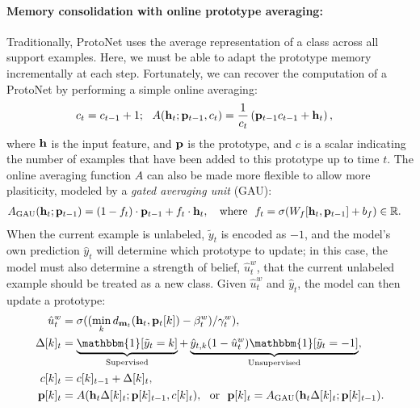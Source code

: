 \paragraph{Memory consolidation with online prototype averaging:}
Traditionally, ProtoNet uses the average representation of a class across all support examples.
Here, we must be able to adapt the prototype memory incrementally at each step. 
Fortunately, we can recover the computation of a ProtoNet by performing a simple online averaging:
\vskip -0.8cm
\begin{align}
c_t &= c_{t-1} + 1; \ \ A(\mathbf{h}_t; \mathbf{p}_{t-1}, c_t) = \frac{1}{c_t} \left( \mathbf{p}_{t-1} c_{t-1} +\mathbf{h}_t \right),
\end{align}
\vskip -0.3cm
where $\mathbf{h}$ is the input feature, and $\mathbf{p}$ is the prototype, and $c$ is a scalar indicating the
number of examples that have been added to this prototype up to time $t$. The online averaging function
$A$ can also be made more flexible to allow more plasiticity, modeled by a
\textit{gated averaging unit} (GAU):
\vskip -0.5cm
\begin{align}
A_{\text{GAU}}(\mathbf{h}_t; \mathbf{p}_{t-1}) &= (1-f_t) \cdot \mathbf{p}_{t-1} + f_t \cdot \mathbf{h}_t, \ \ \ \text{where} \
\ f_t = \sigma(W_f [\mathbf{h}_t, \mathbf{p}_{t-1}] + b_f) \in \mathbb{R}.
\end{align}
\vskip -0.25cm
When the current example is
unlabeled, $\tilde{y}_t$ is encoded as $-1$, and the model's own prediction $\hat{y}_t$ will determine
which prototype to update; in this case, the model must also determine a strength of belief,
$\hat{u}_t^w$, that the current unlabeled example should be treated as a new class.  Given
$\hat{u}_t^w$ and $\hat{y}_t$, the model can then update a prototype:
\vskip -0.5cm
\begin{align}
\hat{u}_t^{w} &= \sigmoid((\min_k d_{\bmm_t}(\bh_t, \bp_t[k]) - \beta_t^w) / \gamma_t^w),\\
\Delta[k]_t   &= \underbrace{\mathbbm{1}[\tilde{y}_t = k]}_{\text{Supervised}} +
             \underbrace{\hat{y}_{t,k} (1 - \hat{u}_t^{w}) \mathbbm{1}[\tilde{y}_t =
-1]}_{\text{Unsupervised}}, \\ c[k]_t        &= c[k]_{t-1} + \Delta[k]_t,\\
\bp[k]_t      &= A(\bh_{t} \Delta[k]_t; \bp[k]_{t-1}, c[k]_t), \ \ \text{or} \ \ \bp[k]_t = A_{\text{GAU}}(\bh_{t} \Delta[k]_t; \bp[k]_{t-1}).
\end{align}
